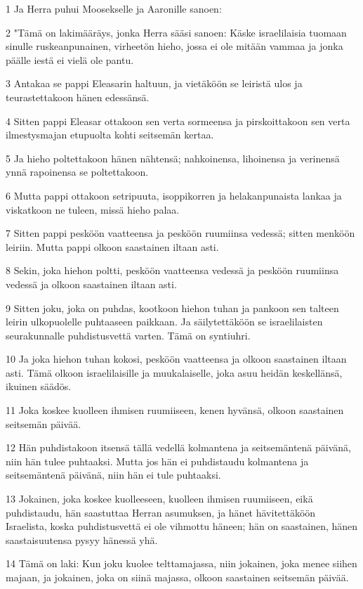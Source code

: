 \par 1 Ja Herra puhui Moosekselle ja Aaronille sanoen:
\par 2 "Tämä on lakimääräys, jonka Herra sääsi sanoen: Käske israelilaisia tuomaan sinulle ruskeanpunainen, virheetön hieho, jossa ei ole mitään vammaa ja jonka päälle iestä ei vielä ole pantu.
\par 3 Antakaa se pappi Eleasarin haltuun, ja vietäköön se leiristä ulos ja teurastettakoon hänen edessänsä.
\par 4 Sitten pappi Eleasar ottakoon sen verta sormeensa ja pirskoittakoon sen verta ilmestysmajan etupuolta kohti seitsemän kertaa.
\par 5 Ja hieho poltettakoon hänen nähtensä; nahkoinensa, lihoinensa ja verinensä ynnä rapoinensa se poltettakoon.
\par 6 Mutta pappi ottakoon setripuuta, isoppikorren ja helakanpunaista lankaa ja viskatkoon ne tuleen, missä hieho palaa.
\par 7 Sitten pappi pesköön vaatteensa ja pesköön ruumiinsa vedessä; sitten menköön leiriin. Mutta pappi olkoon saastainen iltaan asti.
\par 8 Sekin, joka hiehon poltti, pesköön vaatteensa vedessä ja pesköön ruumiinsa vedessä ja olkoon saastainen iltaan asti.
\par 9 Sitten joku, joka on puhdas, kootkoon hiehon tuhan ja pankoon sen talteen leirin ulkopuolelle puhtaaseen paikkaan. Ja säilytettäköön se israelilaisten seurakunnalle puhdistusvettä varten. Tämä on syntiuhri.
\par 10 Ja joka hiehon tuhan kokosi, pesköön vaatteensa ja olkoon saastainen iltaan asti. Tämä olkoon israelilaisille ja muukalaiselle, joka asuu heidän keskellänsä, ikuinen säädös.
\par 11 Joka koskee kuolleen ihmisen ruumiiseen, kenen hyvänsä, olkoon saastainen seitsemän päivää.
\par 12 Hän puhdistakoon itsensä tällä vedellä kolmantena ja seitsemäntenä päivänä, niin hän tulee puhtaaksi. Mutta jos hän ei puhdistaudu kolmantena ja seitsemäntenä päivänä, niin hän ei tule puhtaaksi.
\par 13 Jokainen, joka koskee kuolleeseen, kuolleen ihmisen ruumiiseen, eikä puhdistaudu, hän saastuttaa Herran asumuksen, ja hänet hävitettäköön Israelista, koska puhdistusvettä ei ole vihmottu häneen; hän on saastainen, hänen saastaisuutensa pysyy hänessä yhä.
\par 14 Tämä on laki: Kun joku kuolee telttamajassa, niin jokainen, joka menee siihen majaan, ja jokainen, joka on siinä majassa, olkoon saastainen seitsemän päivää.
